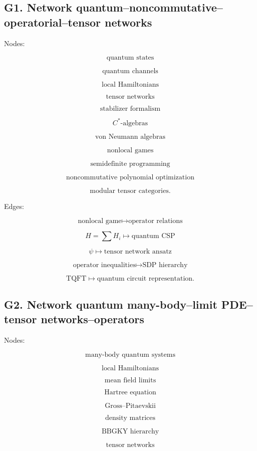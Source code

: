 \documentclass[11pt]{article}
\begin{document}
\subsection{G1. Network quantum--noncommutative--operatorial--tensor networks}

Nodes:

\[
\text{quantum states}
\]

\[
\text{quantum channels}
\]

\[
\text{local Hamiltonians}
\]

\[
\text{tensor networks}
\]

\[
\text{stabilizer formalism}
\]

\[
C^\ast\text{-algebras}
\]

\[
\text{von Neumann algebras}
\]

\[
\text{nonlocal games}
\]

\[
\text{semidefinite programming}
\]

\[
\text{noncommutative polynomial optimization}
\]

\[
\text{modular tensor categories}.
\]

Edges:

\[
\text{nonlocal game}\mapsto \text{operator relations}
\]

\[
H=\sum H_i\mapsto \text{quantum CSP}
\]

\[
\psi\mapsto \text{tensor network ansatz}
\]

\[
\text{operator inequalities}\mapsto \text{SDP hierarchy}
\]

\[
\text{TQFT}\mapsto \text{quantum circuit representation}.
\]



\subsection{G2. Network quantum many-body--limit PDE--tensor networks--operators}

Nodes:

\[
\text{many-body quantum systems}
\]

\[
\text{local Hamiltonians}
\]

\[
\text{mean field limits}
\]

\[
\text{Hartree equation}
\]

\[
\text{Gross--Pitaevskii}
\]

\[
\text{density matrices}
\]

\[
\text{BBGKY hierarchy}
\]

\[
\text{tensor networks}
\]
\end{document}
